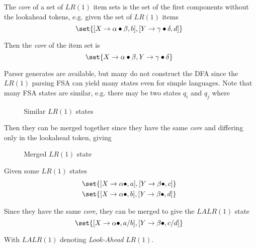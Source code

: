 \begin{definition}
    The \textit{core} of a set of $LR(1)$ item sets is the set of the first components without the lookahead tokens, e.g. given the set of $LR(1)$ items
    \begin{equation}
        \set{ [X \to \alpha \bullet \beta, b], [Y \to \gamma \bullet \delta, d] }
    \end{equation}
    
    Then the \textit{core} of the item set is
    \begin{equation}
        \set{ X \to \alpha \bullet \beta, Y \to \gamma \bullet \delta }
    \end{equation}
\end{definition}

\begin{remark}
    Parser generates are available, but many do not construct the DFA since the $LR(1)$ parsing FSA can yield many states even for simple languages. Note that many FSA states are similar, e.g. there may be two states $q_i$ and $q_j$ where
    \begin{figure}[H]
        \centering
        \caption{Similar $LR(1)$ states}
        \label{fig:similar-lr1-states}
    \end{figure}
    
    Then they can be merged together since they have the same \textit{core} and differing only in the lookahead token, giving
    \begin{figure}[H]
        \centering
        \caption{Merged $LR(1)$ state}
        \label{fig:merged-lr1-state}
    \end{figure}
\end{remark}

\begin{definition}
    Given some $LR(1)$ states
    \begin{equation}
        \begin{aligned}
            &\set{ [X \to \alpha \bullet, a], [Y \to \beta \bullet, c] } \\
            &\set{ [X \to \alpha \bullet, b], [Y \to \beta \bullet, d] }
        \end{aligned}
    \end{equation}
    
    Since they have the same \textit{core}, they can be merged to give the $LALR(1)$ state
    \begin{equation}
        \set{ [X \to \alpha \bullet, a/b], [Y \to \beta \bullet, c/d] }
    \end{equation}
    
    With $LALR(1)$ denoting \textit{Look-Ahead} $LR(1)$.
\end{definition}


